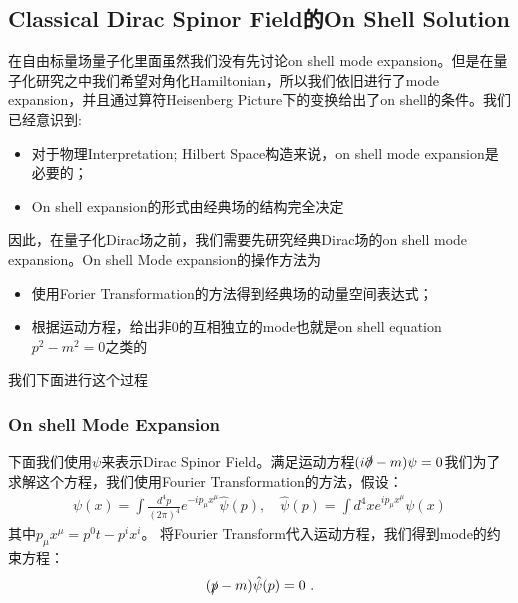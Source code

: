 \subsection{Classical Dirac Spinor Field的On Shell Solution}

在自由标量场量子化里面虽然我们没有先讨论on shell mode
expansion。但是在量子化研究之中我们希望对角化Hamiltonian，所以我们依旧进行了mode
expansion，并且通过算符Heisenberg Picture下的变换给出了on shell的条件。我们已经意识到:
\begin{itemize}
  \item 对于物理Interpretation; Hilbert Space构造来说，on shell mode expansion是必要的；
  \item On shell expansion的形式由经典场的结构完全决定
\end{itemize}
因此，在量子化Dirac场之前，我们需要先研究经典Dirac场的on shell mode expansion。On shell Mode
expansion的操作方法为
\begin{itemize}
  \item 使用Forier Transformation的方法得到经典场的动量空间表达式；
  \item 根据运动方程，给出非0的互相独立的mode也就是on shell equation $ p^2- m^2 = 0 $之类的
\end{itemize}
我们下面进行这个过程

\subsubsection{On shell Mode Expansion}

下面我们使用$ \psi $来表示Dirac Spinor Field。满足运动方程$ (i\slashed{\partial} -m ) \psi
= 0 $我们为了求解这个方程，我们使用Fourier Transformation的方法，假设：
\begin{align}
  \psi(x)=\int\frac{d^4p}{(2\pi)^4}e^{-ip_\mu x^\mu}\hat{\psi}(p),
  \quad \hat{\psi}(p)=\int d^4x\left.e^{ip_\mu x^\mu}\psi(x)\right.
\end{align}
其中$ p_\mu x^\mu =  p^0 t - p^i x^i  $。
将Fourier Transform代入运动方程，我们得到mode的约束方程：
\begin{align}
  (\slashed{p}-m)\hat{\psi}(p)=0\mathrm{~.}
\end{align}

\bigskip
{}

